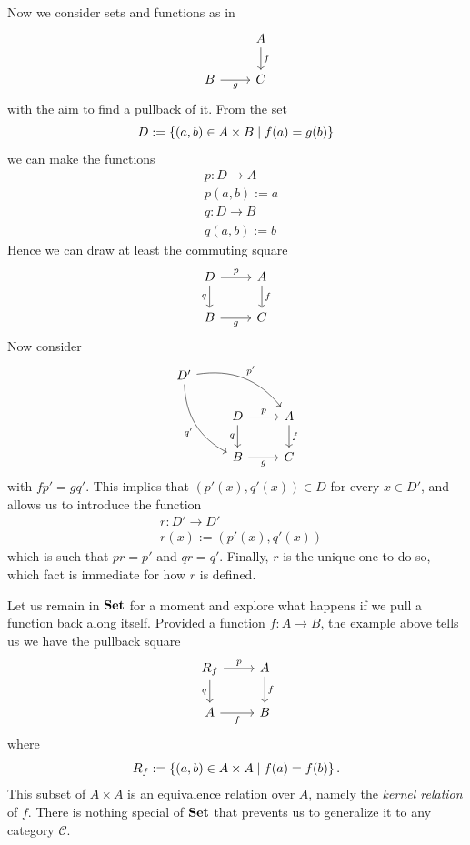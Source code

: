 \begin{example}\label{example:PullbacksInSet}
  Now we consider sets and functions as in
  \[
    \begin{tikzcd}
      & A \ar["f", d] \\
      B \ar["g", r, swap] & C
    \end{tikzcd}
  \]
  with the aim to find a pullback of it. From the set
  \[
    D := \left\{(a, b) \in A \times B \mid f(a) = g(b)\right\}
  \]
  we can make the functions
  \begin{align*}
    & p : D \to A \\
    & p(a, b) := a \\
    & q : D \to B \\
    & q(a, b) := b
  \end{align*}
  Hence we can draw at least the commuting square
  \[
    \begin{tikzcd}
      D \ar["p", r] \ar["q", d, swap] & A \ar["f", d] \\
      B \ar["g", r, swap] & C
    \end{tikzcd}
  \]
  Now consider
  \[
    \begin{tikzcd}
      D' \ar["{p'}", drr, bend left] \ar["{q'}", ddr, bend right, swap]                 \\
      & D \ar["p", r] \ar["q", d, swap]                                & A \ar["f", d] \\
      & B \ar["g", r, swap] & C
    \end{tikzcd}
  \]
  with \(fp' = gq'\). This implies that
  \(\left(p'(x), q'(x)\right) \in D\) for every \(x \in D'\), and allows us
  to introduce the function
  \begin{align*}
    & r : D' \to D' \\
    & r(x) := \left(p'(x), q'(x)\right)
  \end{align*}
  which is such
  that \(p r = p'\) and \(q r = q'\). Finally, \(r\) is the unique one
  to do so, which fact is immediate for how \(r\) is defined.
\end{example}

Let us remain in \(\mathbf{Set}\) for a moment and explore what happens if we
pull a function back along itself. Provided a function \(f : A \to B\),
the example above tells us we have the pullback square
\[
  \begin{tikzcd}
    R_f \ar["p", r] \ar["q", d, swap] & A \ar["f", d] \\
    A \ar["f", r, swap] & B
  \end{tikzcd}
\]
where
\[
  R_f := \left\{(a, b) \in A \times A \mid f(a) = f(b)\right\} .
\]
This subset of \(A \times A\) is an equivalence relation over \(A\), namely
the {\em kernel relation} of \(f\). There is nothing special of \(\mathbf{Set}\)
that prevents us to generalize it to any category \(\mathcal{C}\).

